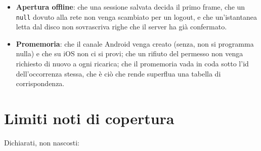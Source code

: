 \documentclass[11pt,a4paper]{report}
\begin{document}
\begin{itemize}[nosep]
        restituito e non il titolo (due regole possono produrre lo stesso
        titolo, e confrontare i testi direbbe ``coperta'' per una regola in
        realt\`a mai raggiunta perch\'e un'altra la precede). Il controllo
        simmetrico --- nessun campione inerte --- impedisce alla lista di
        campioni di sopravvivere alla regola che copriva. Una regola aggiunta
        in mezzo senza un caso che la raggiunga fa fallire la suite, che \`e
        esattamente il cambiamento che nessuno noterebbe.
  \item \textbf{Apertura offline}: che una sessione salvata decida il primo
        frame, che un \texttt{null} dovuto alla rete non venga scambiato per un
        logout, e che un'istantanea letta dal disco non sovrascriva righe che
        il server ha gi\`a confermato.
  \item \textbf{Promemoria}: che il canale Android venga creato (senza, non si
        programma nulla) e che su iOS non ci si provi; che un rifiuto del
        permesso non venga richiesto di nuovo a ogni ricarica; che il
        promemoria vada in coda sotto l'id dell'occorrenza stessa, che \`e
        ci\`o che rende superflua una tabella di corrispondenza.
\end{itemize}

\section{Limiti noti di copertura}

Dichiarati, non nascosti:
\end{document}
